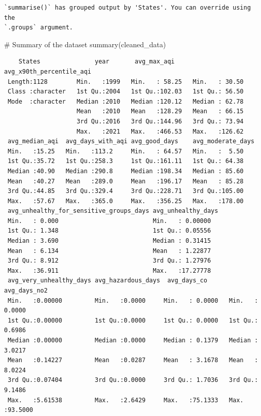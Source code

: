 \documentclass[
  12pt,
]{article}
\newenvironment{Shaded}{\begin{snugshade}}{\end{snugshade}}
\newcommand{\CommentTok}[1]{\textcolor[rgb]{0.37,0.37,0.37}{#1}}
\newcommand{\FunctionTok}[1]{\textcolor[rgb]{0.28,0.35,0.67}{#1}}
\newcommand{\NormalTok}[1]{\textcolor[rgb]{0.00,0.23,0.31}{#1}}
\begin{document}
\begin{verbatim}
`summarise()` has grouped output by 'States'. You can override using the
`.groups` argument.
\end{verbatim}

\begin{Shaded}
\begin{Highlighting}[]
\CommentTok{\# Summary of the dataset}
\FunctionTok{summary}\NormalTok{(cleaned\_data)}
\end{Highlighting}
\end{Shaded}

\begin{verbatim}
    States               year       avg_max_aqi     avg_x90th_percentile_aqi
 Length:1128        Min.   :1999   Min.   : 58.25   Min.   : 30.50          
 Class :character   1st Qu.:2004   1st Qu.:102.03   1st Qu.: 56.50          
 Mode  :character   Median :2010   Median :120.12   Median : 62.78          
                    Mean   :2010   Mean   :128.29   Mean   : 66.15          
                    3rd Qu.:2016   3rd Qu.:144.96   3rd Qu.: 73.94          
                    Max.   :2021   Max.   :466.53   Max.   :126.62          
 avg_median_aqi  avg_days_with_aqi avg_good_days    avg_moderate_days
 Min.   :15.25   Min.   :113.2     Min.   : 64.57   Min.   :  5.50   
 1st Qu.:35.72   1st Qu.:258.3     1st Qu.:161.11   1st Qu.: 64.38   
 Median :40.90   Median :290.8     Median :198.34   Median : 85.60   
 Mean   :40.27   Mean   :289.0     Mean   :196.17   Mean   : 85.28   
 3rd Qu.:44.85   3rd Qu.:329.4     3rd Qu.:228.71   3rd Qu.:105.00   
 Max.   :57.67   Max.   :365.0     Max.   :356.25   Max.   :178.00   
 avg_unhealthy_for_sensitive_groups_days avg_unhealthy_days
 Min.   : 0.000                          Min.   : 0.00000  
 1st Qu.: 1.348                          1st Qu.: 0.05556  
 Median : 3.690                          Median : 0.31415  
 Mean   : 6.134                          Mean   : 1.22877  
 3rd Qu.: 8.912                          3rd Qu.: 1.27976  
 Max.   :36.911                          Max.   :17.27778  
 avg_very_unhealthy_days avg_hazardous_days  avg_days_co       avg_days_no2    
 Min.   :0.00000         Min.   :0.0000     Min.   : 0.0000   Min.   : 0.0000  
 1st Qu.:0.00000         1st Qu.:0.0000     1st Qu.: 0.0000   1st Qu.: 0.6986  
 Median :0.00000         Median :0.0000     Median : 0.1379   Median : 3.0217  
 Mean   :0.14227         Mean   :0.0287     Mean   : 3.1678   Mean   : 8.0224  
 3rd Qu.:0.07404         3rd Qu.:0.0000     3rd Qu.: 1.7036   3rd Qu.: 9.1486  
 Max.   :5.61538         Max.   :2.6429     Max.   :75.1333   Max.   :93.5000  

\end{verbatim}
\end{document}
